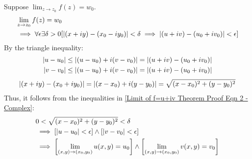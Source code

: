 \documentclass[12pt, english]{book}
\makeatletter
\renewenvironment{proof}[1][\proofname]{\par
	\pushQED{\qed}%
	\normalfont \topsep6\p@\@plus6\p@\relax
	\list{}{%
		\settowidth{\leftmargin}{\itshape\proofname:\hskip\labelsep}%
		\setlength{\labelwidth}{0pt}%
		\setlength{\itemindent}{-\leftmargin}%
		}%
	\item[\hskip\labelsep\itshape#1\@addpunct{:}]\ignorespaces
	}{\popQED\endlist\@endpefalse}
\makeatother
\begin{document}
\begin{proof}
		Suppose $\lim_{z \rightarrow z_0} f(z) = w_0$.
		\begin{align}
			\label{Limit of f=u+iv Theorem Proof Eqn 2 - Complex}
			&\lim_{z \rightarrow z_0} f(z) = w_0 \\ \nonumber
			&\implies \forall \epsilon \exists \delta>0 [\abs{(x+iy)-(x_0-iy_0)}<\delta \implies \abs{(u+iv) - (u_0+iv_0)}<\epsilon]
		\end{align}
		By the triangle inequality: 
		\begin{align*}
			\abs{u-u_0} &\leq \abs{(u-u_0) + i(v-v_0)} = \abs{(u+iv) - (u_0 + iv_0)} \\
			\abs{v-v_0} &\leq \abs{(u-u_0) + i(v-v_0)} = \abs{(u+iv) - (u_0 + iv_0)} 
		\end{align*}
		$$\abs{(x+iy) - (x_0 + iy_0)} = \abs{(x-x_0) + i(y-y_0)} = \sqrt{(x-x_0)^2 + (y-y_0)^2}$$
		Thus, it follows from the inequalities in \cref{Limit of f=u+iv Theorem Proof Eqn 2 - Complex}:
		\begin{align*}
			&0 < \sqrt{(x-x_0)^2 + (y-y_0)^2} < \delta  \\
			&\implies [\abs{u-u_0} < \epsilon ]\land [\abs{v-v_0} < \epsilon] \\
			&\implies \left[\lim_{(x,y) \rightarrow (x_0, y_0)} u(x,y) = u_0 \right] \land
			\left[\lim_{(x,y) \rightarrow (x_0, y_0)} v(x,y) = v_0 \right]
		\end{align*}
	\end{proof}
\end{document}
